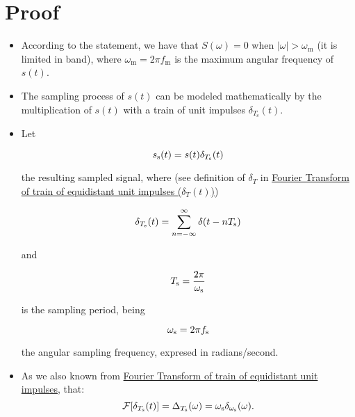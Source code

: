 \section*{Proof}
\begin{itemize}
\item According to the statement, we have that $S(\omega)=0$ when
  $|\omega|>\omega_{\text{m}}$ (it is limited in band), where
  $\omega_{\text{m}}=2\pi f_{\text{m}}$ is the maximum angular frequency
  of $s(t)$.

\item The sampling process of $s(t)$ can be modeled mathematically by
  the multiplication of $s(t)$ with a train of unit impulses
  $\delta_{T_{\text{s}}}(t)$.

\item Let

  \begin{equation}
    s_{\text s}(t)=s(t)\delta_{T_{\text s}}(t)
  \end{equation}

  the resulting sampled signal, where (see definition of $\delta_T$
  in \href{http://localhost:8888/notebooks/Multimedia_Systems/Digitalization/Harmonic_Analysis/harmonic_analysis.ipynb#Fourier-Transform-of-train-of-equidistant-unit-impulses}{Fourier
  Transform of train of equidistant unit impulses ($\delta_T(t)$)})

  \begin{equation}
    \delta_{T_{\text s}}(t) = \sum_{n=-\infty}^{\infty}\delta(t-nT_{\text s})
  \end{equation}

  and

  \begin{equation}
    T_{\text s}=\frac{2\pi}{\omega_{\text s}}
  \end{equation}

  is the sampling period, being

  \begin{equation}
    \omega_{\text s} = 2\pi f_{\text s}
  \end{equation}

    the angular sampling frequency, expresed in radians/second.

\item As we also known from \href{http://localhost:8888/notebooks/Multimedia_Systems/Digitalization/Harmonic_Analysis/harmonic_analysis.ipynb#Fourier-Transform-of-train-of-equidistant-unit-impulses}{Fourier Transform of train of equidistant unit impulses}, that:
  \begin{equation}
    {\mathcal F}[\delta_{T_{\text s}}(t)]=\Delta_{T_{\text s}}(\omega)=\omega_{\text s}\delta_{\omega_{\text s}}(\omega).
  \end{equation}


\end{itemize}
